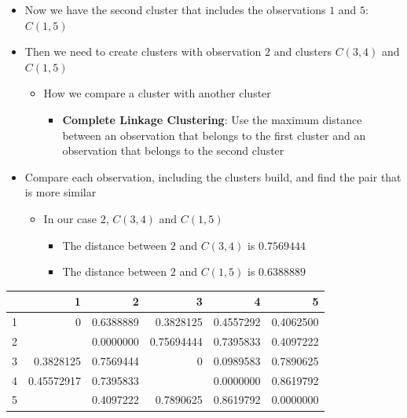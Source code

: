 \documentclass[
  ignorenonframetext,
]{beamer}
\providecommand{\tightlist}{%
  \setlength{\itemsep}{0pt}\setlength{\parskip}{0pt}}\usepackage{longtable,booktabs,array}
\begin{document}
\begin{frame}{}
\label{section-26}
\begin{itemize}
\item
  Now we have the second cluster that includes the observations \(1\)
  and \(5\): \(C(1,5)\)
\item
  Then we need to create clusters with observation \(2\) and clusters
  \(C(3,4)\) and \(C(1,5)\)

  \begin{itemize}
  \item
    How we compare a cluster with another cluster

    \begin{itemize}
    \tightlist
    \item
      \textbf{Complete Linkage Clustering}: Use the maximum distance
      between an observation that belongs to the first cluster and an
      observation that belongs to the second cluster
    \end{itemize}
  \end{itemize}
\end{itemize}
\end{frame}

\begin{frame}{}
\label{section-27}
\begin{itemize}
\item
  Compare each observation, including the clusters build, and find the
  pair that is more similar

  \begin{itemize}
  \item
    In our case \(2\), \(C(3,4)\) and \(C(1,5)\)

    \begin{itemize}
    \tightlist
    \item
      The distance between \(2\) and \(C(3,4)\) is \(0.7569444\)\\
    \item
      The distance between \(2\) and \(C(1,5)\) is \(0.6388889\)
    \end{itemize}
  \end{itemize}
\end{itemize}

\begin{table}
\centering
\begin{tabular}[t]{rrrrrr}
\toprule
  & 1 & 2 & 3 & 4 & 5\\
\midrule
1 & 0 & 0.6388889 & 0.3828125 & 0.4557292 & 0.4062500\\
2 & \cellcolor[HTML]{18BC9C}{\textcolor{white}{0.63888889}} & 0.0000000 & 0.75694444 & 0.7395833 & 0.4097222\\
3 & 0.3828125 & 0.7569444 & 0 & 0.0989583 & 0.7890625\\
4 & 0.45572917 & 0.7395833 & \cellcolor[HTML]{2C3E50}{\textcolor{white}{0.09895833}} & 0.0000000 & 0.8619792\\
5 & \cellcolor[HTML]{E31A1C}{\textcolor{white}{0.40625}} & 0.4097222 & 0.7890625 & 0.8619792 & 0.0000000\\
\bottomrule
\end{tabular}
\end{table}
\end{frame}
\end{document}
